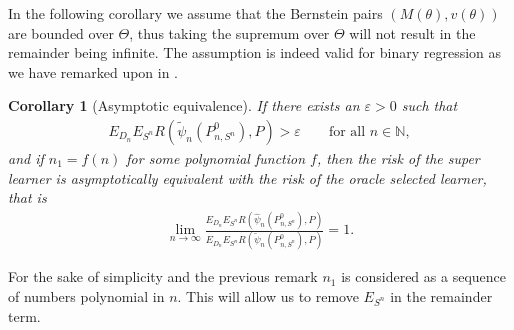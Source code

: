 \documentclass[11pt, a4paper]{article}
\newtheorem{corollary}[theorem]{Corollary}
\theoremstyle{definition}
\theoremstyle{remark}
\newcommand{\btheta}{\theta}
\newcommand{\la}{\psi}
\newcommand{\Sn}{S^n}
\begin{document}
In the following corollary we assume that the Bernstein pairs $ (M(\btheta), v(\btheta)) $ are bounded over $ \Theta $, thus taking the supremum over $ \Theta $ will not result in the remainder being infinite. The assumption is indeed valid for binary regression as we have remarked upon in . 
\begin{corollary}[Asymptotic equivalence] \label{cor:dslasymptoticequivalence}
    If there exists an $ \varepsilon > 0 $ such that 
   \begin{align*}
       E_{D_n} E_{\Sn} R(\tilde{\la}_n(P_{n, \Sn}^{0}), P) > \varepsilon \qquad \text{for all } n \in \mathbb{N},
   \end{align*}
   and if $ n_1 = f(n) $ for some polynomial function $ f $, then the risk of the super learner is asymptotically equivalent with the risk of the oracle selected learner, that is
   \begin{align*}
       \lim_{n \to \infty} \frac{E_{D_n} E_{\Sn} R(\hat{\la}_n(P_{n, \Sn}^{0}), P)}{E_{D_n} E_{\Sn} R(\tilde{\la}_n(P_{n, \Sn}^{0}), P)} = 1.
   \end{align*}
\end{corollary}
For the sake of simplicity and the previous remark $ n_1 $ is considered as a sequence of numbers polynomial in $ n $. This will allow us to remove $ E_{\Sn} $ in the remainder term. 
\end{document}
